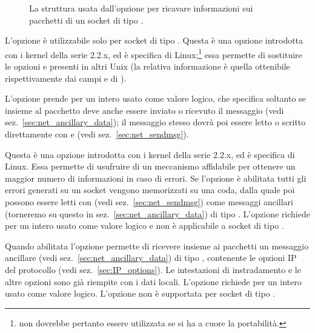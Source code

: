 \begin{basedescript}{\desclabelwidth{2.0cm}\desclabelstyle{\nextlinelabel}}
\begin{figure}[!htb]
  \footnotesize \centering
  \begin{minipage}[c]{0.80\textwidth}
  \end{minipage}
  \caption{La struttura  usata dall'opzione
     per ricavare informazioni sui pacchetti di un socket
    di tipo .}
  \label{fig:sock_pktinfo_struct}
\end{figure}


L'opzione è utilizzabile solo per socket di tipo . Questa è
una opzione introdotta con i kernel della serie 2.2.x, ed è specifica di
Linux;\footnote{non dovrebbe pertanto essere utilizzata se si ha a cuore la
  portabilità.} essa permette di sostituire le opzioni 
e  presenti in altri Unix (la relativa informazione è quella
ottenibile rispettivamente dai campi  e  di
). 

L'opzione prende per  un intero usato come valore logico, che
specifica soltanto se insieme al pacchetto deve anche essere inviato o
ricevuto il messaggio  (vedi
sez.~\ref{sec:net_ancillary_data}); il messaggio stesso dovrà poi essere
letto o scritto direttamente con  e  (vedi
sez.~\ref{sec:net_sendmsg}).

\item[\constd{IP\_RECVERR}] Questa è una opzione introdotta con i kernel della
  serie 2.2.x, ed è specifica di Linux. Essa permette di usufruire di un
  meccanismo affidabile per ottenere un maggior numero di informazioni in caso
  di errori. Se l'opzione è abilitata tutti gli errori generati su un socket
  vengono memorizzati su una coda, dalla quale poi possono essere letti con
   (vedi sez.~\ref{sec:net_sendmsg}) come messaggi ancillari
  (torneremo su questo in sez.~\ref{sec:net_ancillary_data}) di tipo
  .  L'opzione richiede per  un intero usato
  come valore logico e non è applicabile a socket di tipo
  .

\item[\constd{IP\_RECVOPTS}] Quando abilitata l'opzione permette di ricevere
  insieme ai pacchetti un messaggio ancillare (vedi
  sez.~\ref{sec:net_ancillary_data}) di tipo , contenente
  le opzioni IP del protocollo (vedi sez.~\ref{sec:IP_options}). Le
  intestazioni di instradamento e le altre opzioni sono già riempite con i
  dati locali. L'opzione richiede per  un intero usato come
  valore logico.  L'opzione non è supportata per socket di tipo
  .


\end{basedescript}
